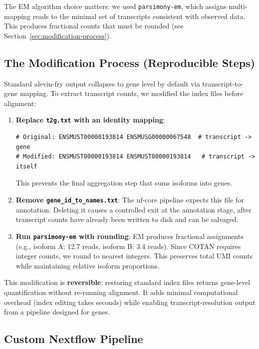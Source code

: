 The EM algorithm choice matters: we used \texttt{parsimony-em}, which assigns multi-mapping reads to the minimal set of transcripts consistent with observed data. This produces fractional counts that must be rounded (see Section~\ref{sec:modification-process}).

\subsection*{The Modification Process (Reproducible Steps)}\label{sec:modification-process}

Standard alevin-fry output collapses to gene level by default via transcript-to-gene mapping. To extract transcript counts, we modified the index files before alignment:

\begin{enumerate}
    \item \textbf{Replace \texttt{t2g.txt} with an identity mapping}:
\begin{verbatim}
# Original: ENSMUST00000193814 ENSMUSG00000067548  # transcript -> gene
# Modified: ENSMUST00000193814 ENSMUST00000193814   # transcript -> itself
\end{verbatim}
    This prevents the final aggregation step that sums isoforms into genes.
    
    \item \textbf{Remove \texttt{gene\_id\_to\_names.txt}}: The nf-core pipeline expects this file for annotation. Deleting it causes a controlled exit at the annotation stage, after transcript counts have already been written to disk and can be salvaged.
    
    \item \textbf{Run \texttt{parsimony-em} with rounding}: EM produces fractional assignments (e.g., isoform A: 12.7 reads, isoform B: 3.4 reads). Since COTAN requires integer counts, we round to nearest integers. This preserves total UMI counts while maintaining relative isoform proportions.
\end{enumerate}

This modification is \textbf{reversible}: restoring standard index files returns gene-level quantification without re-running alignment. It adds minimal computational overhead (index editing takes seconds) while enabling transcript-resolution output from a pipeline designed for genes.

\subsection*{Custom Nextflow Pipeline}

